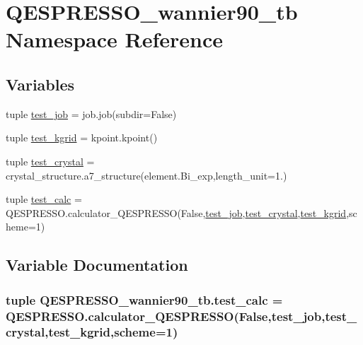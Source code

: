 \hypertarget{namespace_q_e_s_p_r_e_s_s_o__wannier90__tb}{\section{Q\+E\+S\+P\+R\+E\+S\+S\+O\+\_\+wannier90\+\_\+tb Namespace Reference}
\label{namespace_q_e_s_p_r_e_s_s_o__wannier90__tb}
}
\subsection*{Variables}
\begin{DoxyCompactItemize}
\item 
tuple \hyperlink{namespace_q_e_s_p_r_e_s_s_o__wannier90__tb_ac1b80886a2288bbe3449f32f5f1cac0f}{test\+\_\+job} = job.\+job(subdir=False)
\item 
tuple \hyperlink{namespace_q_e_s_p_r_e_s_s_o__wannier90__tb_a793d6d59e699975981e93f16fa752d91}{test\+\_\+kgrid} = kpoint.\+kpoint()
\item 
tuple \hyperlink{namespace_q_e_s_p_r_e_s_s_o__wannier90__tb_a09787f9a7d53d0b6f2fc765d588c4404}{test\+\_\+crystal} = crystal\+\_\+structure.\+a7\+\_\+structure(element.\+Bi\+\_\+exp,length\+\_\+unit=1.)
\item 
tuple \hyperlink{namespace_q_e_s_p_r_e_s_s_o__wannier90__tb_a1ea8ecc59be9597f93a0378deb07a83e}{test\+\_\+calc} = Q\+E\+S\+P\+R\+E\+S\+S\+O.\+calculator\+\_\+\+Q\+E\+S\+P\+R\+E\+S\+S\+O(False,\hyperlink{namespace_q_e_s_p_r_e_s_s_o__wannier90__tb_ac1b80886a2288bbe3449f32f5f1cac0f}{test\+\_\+job},\hyperlink{namespace_q_e_s_p_r_e_s_s_o__wannier90__tb_a09787f9a7d53d0b6f2fc765d588c4404}{test\+\_\+crystal},\hyperlink{namespace_q_e_s_p_r_e_s_s_o__wannier90__tb_a793d6d59e699975981e93f16fa752d91}{test\+\_\+kgrid},scheme=1)
\end{DoxyCompactItemize}


\subsection{Variable Documentation}
\hypertarget{namespace_q_e_s_p_r_e_s_s_o__wannier90__tb_a1ea8ecc59be9597f93a0378deb07a83e}{
\subsubsection[{test\+\_\+calc}]{\setlength{\rightskip}{0pt plus 5cm}tuple Q\+E\+S\+P\+R\+E\+S\+S\+O\+\_\+wannier90\+\_\+tb.\+test\+\_\+calc = Q\+E\+S\+P\+R\+E\+S\+S\+O.\+calculator\+\_\+\+Q\+E\+S\+P\+R\+E\+S\+S\+O(False,{\bf test\+\_\+job},{\bf test\+\_\+crystal},{\bf test\+\_\+kgrid},scheme=1)}}\label{namespace_q_e_s_p_r_e_s_s_o__wannier90__tb_a1ea8ecc59be9597f93a0378deb07a83e}


